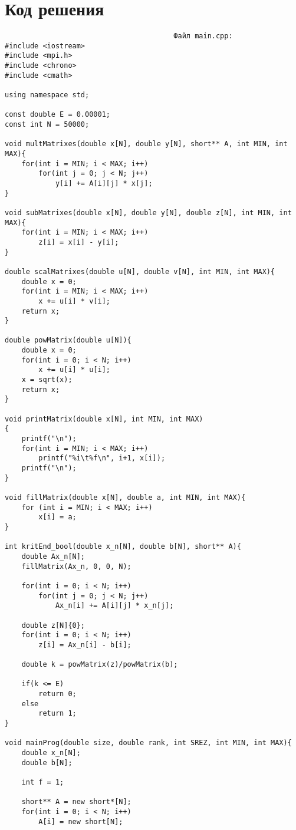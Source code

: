 \documentclass[a4paper, 14pt]{extarticle}
\begin{document}
\section{Код решения}
\begin{verbatim}
                                        Файл main.cpp:
#include <iostream>
#include <mpi.h>
#include <chrono>
#include <cmath>

using namespace std;

const double E = 0.00001;
const int N = 50000;

void multMatrixes(double x[N], double y[N], short** A, int MIN, int MAX){
    for(int i = MIN; i < MAX; i++)
        for(int j = 0; j < N; j++)
            y[i] += A[i][j] * x[j]; 
}

void subMatrixes(double x[N], double y[N], double z[N], int MIN, int MAX){
    for(int i = MIN; i < MAX; i++)
        z[i] = x[i] - y[i];
}

double scalMatrixes(double u[N], double v[N], int MIN, int MAX){
    double x = 0;
    for(int i = MIN; i < MAX; i++)
        x += u[i] * v[i];
    return x;
}

double powMatrix(double u[N]){
    double x = 0;
    for(int i = 0; i < N; i++)
        x += u[i] * u[i];
    x = sqrt(x);
    return x;
}

void printMatrix(double x[N], int MIN, int MAX)
{
    printf("\n");
    for(int i = MIN; i < MAX; i++)
        printf("%i\t%f\n", i+1, x[i]);
    printf("\n");
}

void fillMatrix(double x[N], double a, int MIN, int MAX){
    for (int i = MIN; i < MAX; i++)
        x[i] = a;
}

int kritEnd_bool(double x_n[N], double b[N], short** A){
    double Ax_n[N];
    fillMatrix(Ax_n, 0, 0, N);

    for(int i = 0; i < N; i++)
        for(int j = 0; j < N; j++)
            Ax_n[i] += A[i][j] * x_n[j];

    double z[N]{0};
    for(int i = 0; i < N; i++)
        z[i] = Ax_n[i] - b[i];

    double k = powMatrix(z)/powMatrix(b);

    if(k <= E)
        return 0;
    else
        return 1;
}

void mainProg(double size, double rank, int SREZ, int MIN, int MAX){
    double x_n[N];
    double b[N];

    int f = 1;

    short** A = new short*[N];
    for(int i = 0; i < N; i++)
        A[i] = new short[N];


\end{verbatim}
\end{document}
